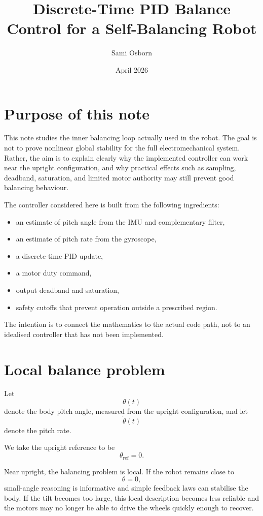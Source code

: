 \documentclass[11pt,a4paper]{article}
\author{Sami Osborn}
\title{Discrete-Time PID Balance Control for a Self-Balancing Robot}
\date{April 2026}
\begin{document}
\maketitle

\section{Purpose of this note}

This note studies the inner balancing loop actually used in the robot. The goal is not to prove nonlinear global stability for the full electromechanical system. Rather, the aim is to explain clearly why the implemented controller can work near the upright configuration, and why practical effects such as sampling, deadband, saturation, and limited motor authority may still prevent good balancing behaviour.

The controller considered here is built from the following ingredients:
\begin{itemize}
    \item an estimate of pitch angle from the IMU and complementary filter,
    \item an estimate of pitch rate from the gyroscope,
    \item a discrete-time PID update,
    \item a motor duty command,
    \item output deadband and saturation,
    \item safety cutoffs that prevent operation outside a prescribed region.
\end{itemize}

The intention is to connect the mathematics to the actual code path, not to an idealised controller that has not been implemented.

\section{Local balance problem}

Let
\[
\theta(t)
\]
denote the body pitch angle, measured from the upright configuration, and let
\[
\dot{\theta}(t)
\]
denote the pitch rate.

We take the upright reference to be
\[
\theta_{\mathrm{ref}} = 0.
\]

Near upright, the balancing problem is local. If the robot remains close to
\[
\theta = 0,
\]
small-angle reasoning is informative and simple feedback laws can stabilise the body. If the tilt becomes too large, this local description becomes less reliable and the motors may no longer be able to drive the wheels quickly enough to recover.
\end{document}
